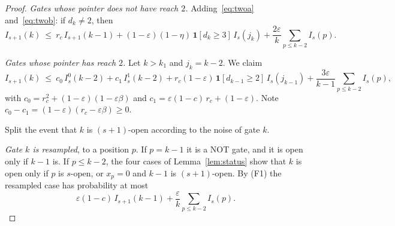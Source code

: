 \documentclass[11pt]{amsart}
\theoremstyle{definition}
\theoremstyle{remark}
\newcommand{\eps}{\varepsilon}
\begin{document}
\begin{proof}
\emph{Gates whose pointer does not have reach $2$.} Adding~\eqref{eq:twoa} and~\eqref{eq:twob}: if
$d_k\ne2$, then
\begin{equation}\label{eq:generic}
I_{s+1}(k)\ \le\ r_c\,I_{s+1}(k-1)+(1-\eps)(1-\eta)\,\mathbf 1[d_k\ge3]\,I_s(j_k)
+\frac{2\eps}k\sum_{p\le k-2}I_s(p).
\end{equation}

\emph{Gates whose pointer has reach $2$.} Let $k>k_1$ and $j_k=k-2$. We claim
\begin{equation}\label{eq:reachtwo}
I_{s+1}(k)\ \le\ c_0\,I^0_s(k-2)+c_1\,I^1_s(k-2)+r_c(1-\eps)\,\mathbf 1[d_{k-1}\ge2]\,I_s(j_{k-1})
+\frac{3\eps}{k-1}\sum_{p\le k-2}I_s(p),
\end{equation}
with $c_0=r_c^2+(1-\eps)(1-\eps\beta)$ and $c_1=\eps(1-c)\,r_c+(1-\eps)$. Note
$c_0-c_1=(1-\eps)(r_c-\eps\beta)\ge0$.

Split the event that $k$ is $(s+1)$-open according to the noise of gate $k$.

\emph{Gate $k$ is resampled}, to a position $p$. If $p=k-1$ it is a NOT gate, and it is open only
if $k-1$ is. If $p\le k-2$, the four cases of Lemma~\ref{lem:status} show that $k$ is open only
if $p$ is $s$-open, or $x_p=0$ and $k-1$ is $(s+1)$-open. By (F1) the resampled case has
probability at most
\[
\eps(1-c)\,I_{s+1}(k-1)+\frac\eps k\sum_{p\le k-2}I_s(p).
\]


\end{proof}
\end{document}
